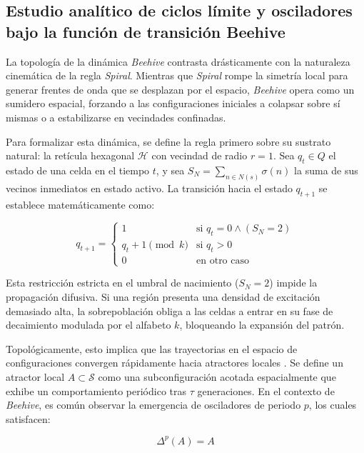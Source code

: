 \subsection{Estudio analítico de ciclos límite y osciladores bajo la función de transición Beehive}
\label{subsec:analisis_beehive}

La topología de la dinámica \textit{Beehive} contrasta drásticamente con la naturaleza cinemática de la regla \textit{Spiral}. Mientras que \textit{Spiral} rompe la simetría local para generar frentes de onda que se desplazan por el espacio, \textit{Beehive} opera como un sumidero espacial, forzando a las configuraciones iniciales a colapsar sobre sí mismas o a estabilizarse en vecindades confinadas.

Para formalizar esta dinámica, se define la regla primero sobre su sustrato natural: la retícula hexagonal $\mathcal{H}$ con vecindad de radio $r=1$. Sea $q_t \in Q$ el estado de una celda en el tiempo $t$, y sea $S_N = \sum_{n \in N(s)} \sigma(n)$ la suma de sus vecinos inmediatos en estado activo. La transición hacia el estado $q_{t+1}$ se establece matemáticamente como:

\begin{equation}
q_{t+1} = 
\begin{cases} 
1 & \text{si } q_t = 0 \wedge (S_N = 2) \\
q_t + 1 \pmod{k} & \text{si } q_t > 0 \\
0 & \text{en otro caso}
\end{cases}
\label{eq:regla_beehive_hex}
\end{equation}

Esta restricción estricta en el umbral de nacimiento ($S_N = 2$) impide la propagación difusiva. Si una región presenta una densidad de excitación demasiado alta, la sobrepoblación obliga a las celdas a entrar en su fase de decaimiento modulada por el alfabeto $k$, bloqueando la expansión del patrón. 

Topológicamente, esto implica que las trayectorias en el espacio de configuraciones convergen rápidamente hacia atractores locales \cite{Wolfram2002}. Se define un atractor local $A \subset \mathcal{S}$ como una subconfiguración acotada espacialmente que exhibe un comportamiento periódico tras $\tau$ generaciones. En el contexto de \textit{Beehive}, es común observar la emergencia de osciladores de periodo $p$, los cuales satisfacen:

\begin{equation}
\Delta^p(A) = A
\label{eq:oscilador_periodo}
\end{equation}

